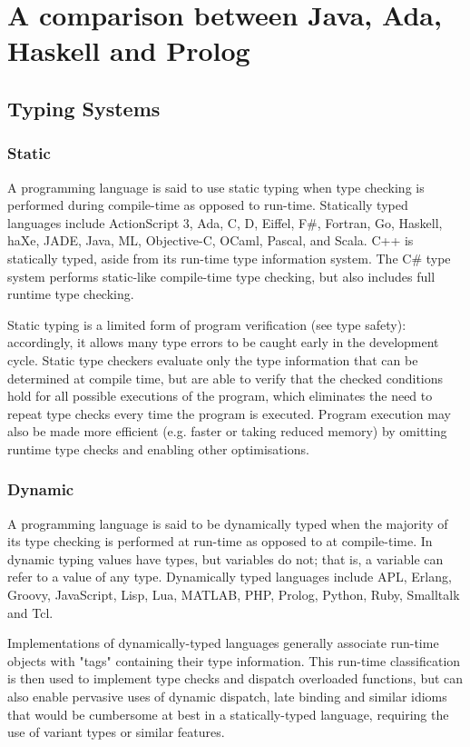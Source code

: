 \documentclass[a4paper,oneside]{report}
\begin{document}
\section{A comparison between Java, Ada, Haskell and Prolog}


	\subsection{Typing Systems}

		\subsubsection{Static}

		A programming language is said to use static typing when type checking is performed during compile-time as opposed to run-time. Statically typed languages include ActionScript 3, Ada, C, D, Eiffel, F\#, Fortran, Go, Haskell, haXe, JADE, Java, ML, Objective-C, OCaml, Pascal, and Scala. C++ is statically typed, aside from its run-time type information system. The C\# type system performs static-like compile-time type checking, but also includes full runtime type checking. 

		Static typing is a limited form of program verification (see type safety): accordingly, it allows many type errors to be caught early in the development cycle. Static type checkers evaluate only the type information that can be determined at compile time, but are able to verify that the checked conditions hold for all possible executions of the program, which eliminates the need to repeat type checks every time the program is executed. Program execution may also be made more  efficient (e.g. faster or taking reduced memory) by omitting runtime type checks and enabling other optimisations.


		\subsubsection{Dynamic}
		
		A programming language is said to be dynamically typed when the majority of its type checking is performed at run-time as opposed to at compile-time. In dynamic typing values have types, but variables do not; that is, a variable can refer to a value of any type. Dynamically typed languages include APL, Erlang, Groovy, JavaScript, Lisp, Lua, MATLAB, PHP, Prolog, Python, Ruby, Smalltalk and Tcl.

 	 	Implementations of dynamically-typed languages generally associate run-time objects with "tags" containing their type information. This run-time classification is then used to implement type checks and dispatch overloaded functions, but can also enable pervasive uses of dynamic dispatch, late binding and similar idioms that would be cumbersome at best in a statically-typed language, requiring the use of variant types or similar features.
\end{document}
